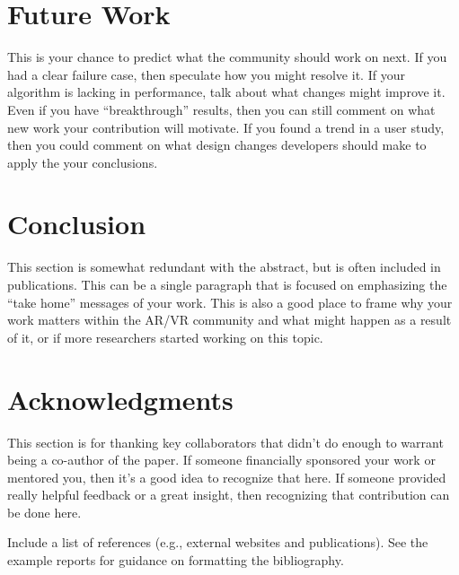 \documentclass[acmtog,nonacm]{acmart}
\begin{document}
\section{Future Work}
\label{sec:future_work}

This is your chance to predict what the community should work on next. If you had a clear failure case, then speculate how you might resolve it. If your algorithm is lacking in performance, talk about what changes might improve it. Even if you have ``breakthrough'' results, then you can still comment on what new work your contribution will motivate. If you found a trend in a user study, then you could comment on what design changes developers should make to apply the your conclusions.

\section{Conclusion}

This section is somewhat redundant with the abstract, but is often included in publications. This can be a single paragraph that is focused on emphasizing the ``take home'' messages of your work. This is also a good place to frame why your work matters within the AR/VR community and what might happen as a result of it, or if more researchers started working on this topic.

\section*{Acknowledgments}

This section is for thanking key collaborators that didn't do enough to warrant being a co-author of the paper. If someone financially sponsored your work or mentored you, then it's a good idea to recognize that here. If someone provided really helpful feedback or a great insight, then recognizing that contribution can be done here.



Include a list of references (e.g., external websites and publications). See the example reports for guidance on formatting the bibliography.
\end{document}
